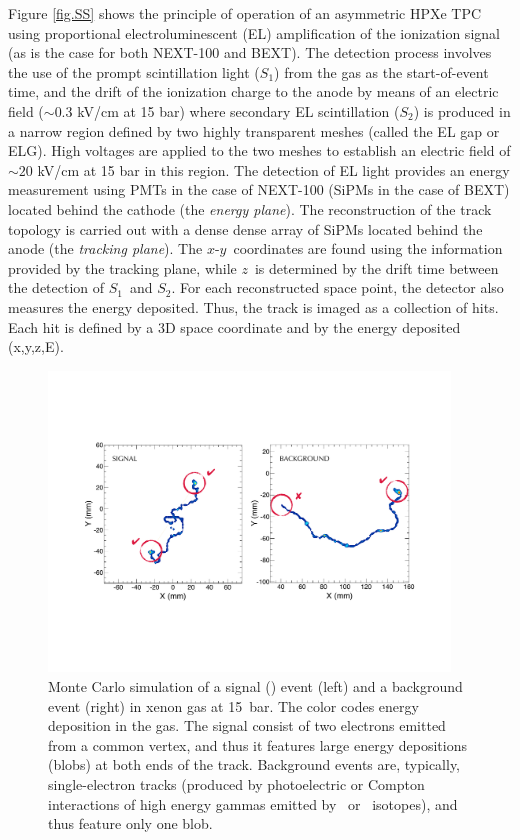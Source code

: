 \documentclass{JINST}
\begin{document}
Figure \ref{fig.SS} shows the principle of operation of an asymmetric HPXe TPC using proportional electroluminescent (EL) amplification of the ionization signal (as is the case for both NEXT-100 and BEXT). The detection process involves the use of the prompt scintillation light ($S_1$) from the gas as the start-of-event time, and the drift of the ionization charge to the anode by means of an electric field ($\sim0.3$ kV/cm at 15 bar) where secondary EL scintillation ($S_2$) is produced in a narrow region defined by two highly transparent meshes (called the EL gap or ELG).  High voltages are applied to the two meshes to establish an electric field of $\sim20$ kV/cm at 15 bar in this region. The detection of EL light provides an energy measurement using PMTs in the case of NEXT-100 (SiPMs in the case of BEXT) located behind the cathode (the \emph{energy plane}). The reconstruction of the track topology is carried out with a dense dense array of SiPMs located behind the anode (the \emph{tracking plane}). The $x$-$y$~coordinates are found using the information provided by the tracking plane, while $z$~is determined by the drift time between the detection of $S_1$~and $S_2$. For each reconstructed space point, the detector also measures the energy deposited. Thus, the track is imaged as a collection of hits. Each hit is defined by a 3D space coordinate and by the energy deposited (x,y,z,E).

\begin{figure}[!htb]
\centering
\includegraphics[width= 0.95\textwidth]{img/TrackSignature.pdf}
\caption{Monte Carlo simulation of a signal (\bbonu) event (left) and a  background event (right) in xenon gas at 15~bar. The color codes energy deposition in the gas. The signal consist of two electrons emitted from a common vertex, and thus it features large energy depositions  (blobs) at both ends of the track. Background events are, typically, single-electron tracks (produced by photoelectric or Compton interactions of high energy gammas emitted by \BI\ or \TL\ isotopes), and thus feature only one blob.} \label{fig.ETRK2}
\end{figure}
\end{document}
